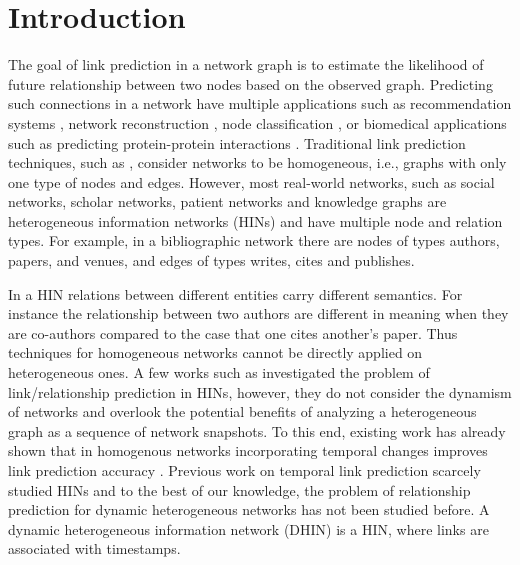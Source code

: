 \section{Introduction}
\label{Sec:Introduction}


The goal of link prediction in a network graph \cite{liben2007link} is to estimate the likelihood of future relationship between two nodes based on the observed graph. Predicting such connections in a network have multiple applications such as recommendation systems \cite{chen2005link,song2009scalable,lu2012recommender,li2013recommendation,guy2015social}, network reconstruction \cite{guimera2009missing}, node classification \cite{gallagher2008using}, or biomedical applications such as predicting protein-protein interactions \cite{lei2012novel}. Traditional link prediction techniques, such as \cite{liben2007link}, consider networks to be homogeneous, i.e., graphs with only one type of nodes and edges. However, most real-world networks, such as social networks, scholar networks, patient networks \cite{denny2012mining} and knowledge graphs \cite{wang2015incorporating} are heterogeneous information networks (HINs) \cite{shi2017survey} and have multiple node and relation types. For example, in a bibliographic network there are nodes of types authors, papers, and venues, and edges of types writes, cites and publishes.

In a HIN relations between different entities carry different semantics. For instance the relationship between two authors are different in meaning when they are co-authors compared to the case that one cites another's paper. Thus techniques for homogeneous networks cannot be directly applied on heterogeneous ones. A few works such as \cite{sun2011pathsim,sun2011ASONAM} investigated the problem of link/relationship prediction in HINs, however, they do not consider the dynamism of networks and overlook the potential benefits of analyzing a heterogeneous graph as a sequence of network snapshots. To this end, existing work has already shown that in homogenous networks incorporating temporal changes improves link prediction accuracy \cite{Zhu2016}. Previous work on temporal link prediction scarcely studied HINs and to the best of our knowledge, the problem of relationship prediction for dynamic heterogeneous networks has not been studied before. A dynamic heterogeneous information network (DHIN) is a HIN, where links are associated with timestamps.

